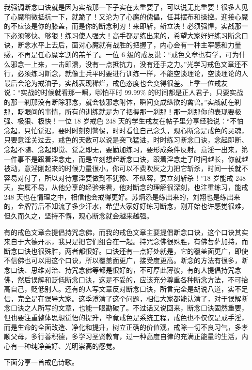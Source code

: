 我强调断念口诀就是因为实战那一下子实在太重要了，可以说无比重要！很多人见了心魔稍微抵抗一下，就跪了！又沦为了心魔的傀儡，任其摆布和操控。迎接心魔的不应该是你的膝盖，而是你的断念利刃！来即斩，斩立决！必须强悍，实战那一下必须够快、够狠！练习使人强大！高手都是练出来的，希望大家好好练习断念口诀，断念水平上去后，面对心魔就有战胜的把握了，内心会有一种主宰感和力量感，不再是任心魔宰割的羔羊了。一位 6 级的戒友说：“戒色文章也有学，可为什么邪念一上来，一击即溃，没有一点抵抗力，没有还手之力。”光学习戒色文章还不行，必须练习断念，就像士兵平时要进行训练一样，不能空谈理论，空谈理论的人最后会沦为戒油子，实战表现稀烂，戒色态度也会变得很差。上季一位戒友说：“实战的时候就看那一瞬，哪怕平时 99.99\% 的时间都是正人君子，只要实战的那一刹那没有断除邪念，就会被邪念附体，瞬间变成纵欲的禽兽。”实战就在刹那，眨眼间的事情，所有的训练就是为了把握那一刹那！那一刹那你的表现要极强、极狠、极快！一位 18 岁戒色 248 天的学生戒友在帖子里分享经验说：“不怕念起，只怕觉迟，要时时刻刻警惕，时时看住自己念头，观心断念是戒色的灵魂，只要意淫关过去，戒色的天数可以说是突飞猛进，时时练习断念口诀，念起即断、念起不随、念起即觉、觉之即无，要勤加练习，要形成条件反射。意淫一出来，第一件事不是跟着淫念走，而是立刻想起断念口诀，跟着淫念走了时间越长，你就越被动，意淫刚起来的时候力量很小，你可以不费吹灰之力把它斩杀，时间一长就不容易对付了，所以对待意淫要做到不犹豫、不纵容，要立刻斩杀！”18 岁能戒 248 天，实属不易，从他分享的经验来看，他对断念的理解很深刻，也注重练习，能戒 248 天也在情理之中，相信他会戒得更好。苏炳添是练出来的，刘翔也是练出来的，金牌背后不知流了多少汗水，希望大家好好练习断念，刚开始也许感觉很难，但久而久之，坚持不懈，观心断念就会越来越强。

有的戒色文章会提倡持咒念佛，而我的戒色文章主要提倡断念口诀，这个口诀其实来自于大德开示，我只是把它们组合在一起。持咒念佛很殊胜，有佛菩萨加持，而断念口诀也很殊胜，两者都很好。口诀还有一点好处就是，它的覆盖面更广，即使不信佛也可以用这个口诀，所以覆盖面更广，接受度更高。断念的方法有很多，断念口诀、思维对治、持咒念佛等都是很好的，不可厚此薄彼，有的人提倡持咒念佛，然后误解和贬低断念口诀，这是不妥的，应该充分尊重各种断念方法，不可抬高自己，贬低别人。还有的人写文章反对断念口诀，所言完全是胡说八道，实不足信，完全是在误导大家。这季澄清了这个问题，相信大家都能认清了，对于误解断念口诀之人所写的文章，也能一眼勘破了。不过话又说回来，断念口诀固然重要，但也要注重整体思想觉悟的提升，毕竟戒色是系统工程，戒色也不仅仅是戒手淫，而是生命的全面改造、净化和提升，树立正确的价值观，戒除一切不良习气，多孝顺父母，多行善积德，多学习圣贤教育，过一种高度自律的充满正能量的生活，内心有一种纯净美好、光明崇高的感觉。

下面分享一首戒色诗歌。

